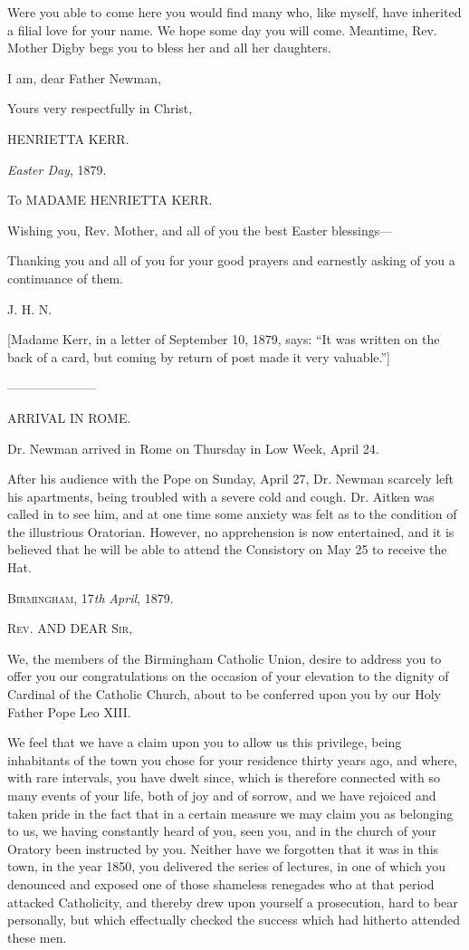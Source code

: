 Were you able to come here you would find many who, like myself,
have inherited a filial love for your name. We hope some day you will
come. Meantime, Rev. Mother Digby begs you to bless her and all her
daughters.

I am, dear Father Newman,

Yours very respectfully in Christ,

HENRIETTA KERR.


\emph{Easter Day}, 1879.

To MADAME HENRIETTA KERR.

Wishing you, Rev. Mother, and all of you the best Easter blessings—

Thanking you and all of you for your good prayers and earnestly
asking of you a continuance of them.

J. H. N.

[Madame Kerr, in a letter of September 10, 1879, says: ``It was
written on the back of a card, but coming by return of post made it
very valuable.'']

———————

ARRIVAL IN ROME.

Dr. Newman arrived in Rome on Thursday in Low Week, April 24.

After his audience with the Pope on Sunday, April 27, Dr. Newman
scarcely left his apartments, being troubled with a severe cold and
cough. Dr. Aitken was called in to see him, and at one time some
anxiety was felt as to the condition of the illustrious Oratorian.
However, no apprehension is now entertained, and it is believed that
he will be able to attend the Consistory on May 25 to receive the Hat.


B\textsc{irmingham}, 17\emph{th} \emph{April}, 1879.

R\textsc{ev}. AND DEAR
S\textsc{ir},

We, the members of the Birmingham Catholic Union, desire to address
you to offer you our congratulations on the occasion of your elevation
to the dignity of Cardinal of the Catholic Church, about to be
conferred upon you by our Holy Father Pope Leo XIII.

We feel that we have a claim upon you to allow us this privilege,
being inhabitants of the town you chose for your residence thirty
years ago, and where, with rare intervals, you have dwelt since, which
is therefore connected with so many events of your life, both of joy
and of sorrow, and we have rejoiced and taken pride in the fact that
in a certain measure we may claim you as belonging to us, we having
constantly heard of you, seen you, and in the church of your Oratory
been instructed by you. Neither have we forgotten that it was in this
town, in the year 1850, you delivered the series of lectures, in one
of which you denounced and exposed one of those shameless renegades
who at that period attacked Catholicity, and thereby drew upon
yourself a prosecution, hard to bear personally, but which effectually
checked the success which had hitherto attended these men.

